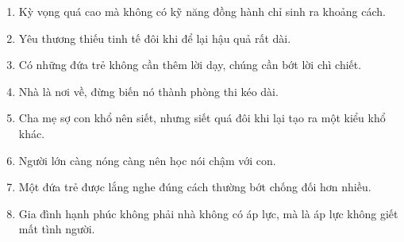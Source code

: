 \begin{enumerate}[leftmargin=*]
\item Kỳ vọng quá cao mà không có kỹ năng đồng hành chỉ sinh ra khoảng cách.
\item Yêu thương thiếu tinh tế đôi khi để lại hậu quả rất dài.
\item Có những đứa trẻ không cần thêm lời dạy, chúng cần bớt lời chì chiết.
\item Nhà là nơi về, đừng biến nó thành phòng thi kéo dài.
\item Cha mẹ sợ con khổ nên siết, nhưng siết quá đôi khi lại tạo ra một kiểu khổ khác.
\item Người lớn càng nóng càng nên học nói chậm với con.
\item Một đứa trẻ được lắng nghe đúng cách thường bớt chống đối hơn nhiều.
\item Gia đình hạnh phúc không phải nhà không có áp lực, mà là áp lực không giết mất tình người.
\end{enumerate}

